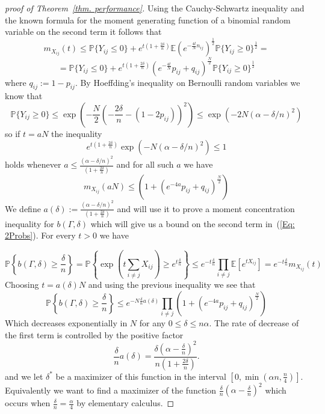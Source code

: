 \documentclass[12pt]{amsart}
\theoremstyle{remark}
\newcommand{\PP}{\mathbb{P}}
\newcommand{\EE}{\mathbb{E}}
\begin{document}
\begin{proof} [proof of Theorem~\ref{thm. performance}]
Using the Cauchy-Schwartz inequality and the known formula for the moment generating function of a binomial random variable on the second term it follows that
\[ m_{X_{ij}}(t)\leq \PP\{Y_{ij}\leq 0\}+ e^{t\left(1+\frac{2\delta}{n}\right)}\EE\left(e^{-\frac{4t}{N}n_{ij}}\right)^{\frac{1}{2}}\PP\{Y_{ij}\geq 0\}^{\frac{1}{2}}=\]
\[=\PP\{Y_{ij}\leq 0\}+ e^{t\left(1+\frac{2\delta}{n}\right)}\left(e^{-\frac{4t}{N}}p_{ij} + q_{ij}\right)^{\frac{N}{2}}\PP\{Y_{ij}\geq 0\}^{\frac{1}{2}}\]
where $q_{ij}:=1-p_{ij}$.
By Hoeffding's inequality on Bernoulli random variables we know that
\[\PP\{Y_{ij}\geq 0\}\leq \exp\left(-\frac{N}{2}\left(-\frac{2\delta}{n}-(1-2p_{ij})\right)^2 \right)\leq \exp\left(-2N(\alpha-\delta/n)^2\right)\]
so if $t=aN$ the inequality 
\[e^{t\left(1+\frac{2\delta}{n}\right)}\exp\left(-N(\alpha-\delta/n)^2\right)\leq 1\] 
holds whenever $a\leq \frac{(\alpha-\delta/n)^2}{\left(1+\frac{2\delta}{n}\right)}$ and for all such $a$ we have
\[m_{X_{ij}}(aN)\leq \left(1+ (e^{-4a}p_{ij}+q_{ij})^{\frac{N}{2}}\right)\]
We define $a(\delta):=\frac{(\alpha-\delta/n)^2}{\left(1+\frac{2\delta}{n}\right)}$ and will use it to prove a moment concentration inequality for $b(\Gamma,\delta)$ which will give us a bound on the second term in~(\ref{Eq: 2Probs}). For every $t>0$ we have

\[\PP\left\{b(\Gamma,\delta)\geq \frac{\delta}{n}\right\}=\PP\left\{\exp\left(t\sum_{i\neq j} X_{ij}\right)\geq e^{t\frac{\delta}{n}}\right\}\leq e^{-t\frac{\delta}{n}}\prod_{i\neq j} \EE[e^{tX_{ij}}]= e^{-t\frac{\delta}{n}}m_{X_{ij}}(t)\]
Choosing $t=a(\delta)N$ and using the previous inequality we see that
\[\PP\left\{b(\Gamma,\delta)\geq \frac{\delta}{n}\right\}\leq e^{-N\frac{\delta}{n} a(\delta)}\prod_{i\neq j}\left(1+ (e^{-4a}p_{ij}+q_{ij})^{\frac{N}{2}}\right)\]
Which decreases exponentially in $N$ for any $0\leq \delta\leq n\alpha$. The rate of decrease of the first term is controlled by the positive factor 
\[\frac{\delta}{n} a(\delta)= \frac{\delta\left(\alpha-\frac{\delta}{n}\right)^2}{n\left(1+\frac{2\delta}{n}\right)}.\]
and we let $\delta^*$ be a maximizer of this function in the interval $[0,\min(\alpha n, \frac{n}{4})]$. Equivalently we want to find a maximizer of the function $\frac{\delta}{n}\left(\alpha-\frac{\delta}{n}\right)^2$ which occurs when $\frac{\delta}{n} =\frac{\alpha}{4}$ by elementary calculus. 



\end{proof}
\end{document}
